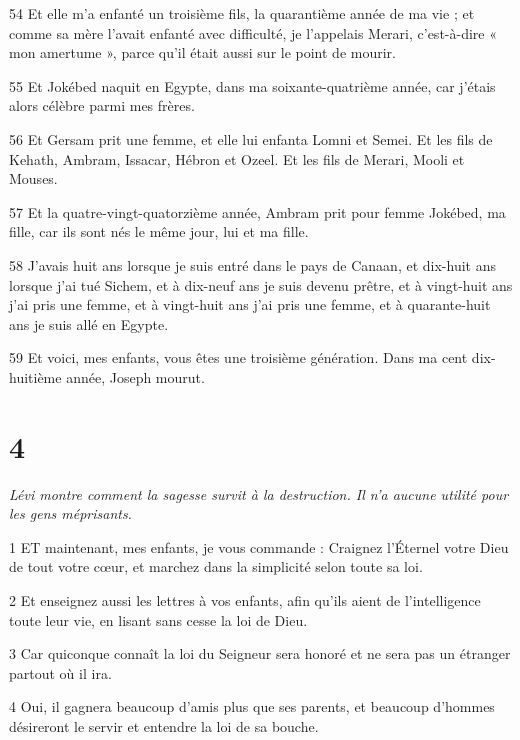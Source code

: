 \par 54 Et elle m'a enfanté un troisième fils, la quarantième année de ma vie ; et comme sa mère l'avait enfanté avec difficulté, je l'appelais Merari, c'est-à-dire « mon amertume », parce qu'il était aussi sur le point de mourir.

\par 55 Et Jokébed naquit en Egypte, dans ma soixante-quatrième année, car j'étais alors célèbre parmi mes frères.

\par 56 Et Gersam prit une femme, et elle lui enfanta Lomni et Semei. Et les fils de Kehath, Ambram, Issacar, Hébron et Ozeel. Et les fils de Merari, Mooli et Mouses.

\par 57 Et la quatre-vingt-quatorzième année, Ambram prit pour femme Jokébed, ma fille, car ils sont nés le même jour, lui et ma fille.

\par 58 J'avais huit ans lorsque je suis entré dans le pays de Canaan, et dix-huit ans lorsque j'ai tué Sichem, et à dix-neuf ans je suis devenu prêtre, et à vingt-huit ans j'ai pris une femme, et à vingt-huit ans j'ai pris une femme, et à quarante-huit ans je suis allé en Egypte.

\par 59 Et voici, mes enfants, vous êtes une troisième génération. Dans ma cent dix-huitième année, Joseph mourut.

\chapter{4}

\par \textit{Lévi montre comment la sagesse survit à la destruction. Il n'a aucune utilité pour les gens méprisants.}

\par 1 ET maintenant, mes enfants, je vous commande : Craignez l'Éternel votre Dieu de tout votre cœur, et marchez dans la simplicité selon toute sa loi.

\par 2 Et enseignez aussi les lettres à vos enfants, afin qu'ils aient de l'intelligence toute leur vie, en lisant sans cesse la loi de Dieu.

\par 3 Car quiconque connaît la loi du Seigneur sera honoré et ne sera pas un étranger partout où il ira.

\par 4 Oui, il gagnera beaucoup d'amis plus que ses parents, et beaucoup d'hommes désireront le servir et entendre la loi de sa bouche.

